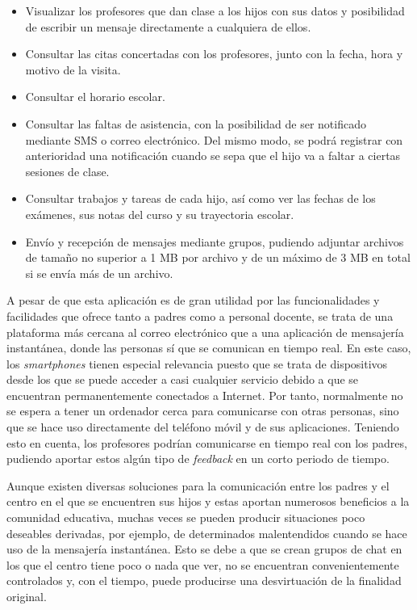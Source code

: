 \begin{itemize}
	\item Visualizar los profesores que dan clase a los hijos con sus datos y posibilidad de escribir un mensaje directamente a cualquiera de ellos.
	\item Consultar las citas concertadas con los profesores, junto con la fecha, hora y motivo de la visita.
	\item Consultar el horario escolar.
	\item Consultar las faltas de asistencia, con la posibilidad de ser notificado mediante \acf{SMS} o correo electrónico. Del mismo modo, se podrá registrar con anterioridad una notificación cuando se sepa que el hijo va a faltar a ciertas sesiones de clase.
	\item Consultar trabajos y tareas de cada hijo, así como ver las fechas de los exámenes, sus notas del curso y su trayectoria escolar.
	\item Envío y recepción de mensajes mediante grupos, pudiendo adjuntar archivos de tamaño no superior a 1 \acf{MB} por archivo y de un máximo de 3 \acs{MB} en total si se envía más de un archivo.
\end{itemize}

A pesar de que esta aplicación es de gran utilidad por las funcionalidades y facilidades que ofrece tanto a padres como a personal docente, se trata de una plataforma más cercana al correo electrónico que a una aplicación de mensajería instantánea, donde las personas sí que se comunican en tiempo real. En este caso, los \textit{smartphones} tienen especial relevancia puesto que se trata de dispositivos desde los que se puede acceder a casi cualquier servicio debido a que se encuentran permanentemente conectados a Internet. Por tanto, normalmente no se espera a tener un ordenador cerca para comunicarse con otras personas, sino que se hace uso directamente del teléfono móvil y de sus aplicaciones. Teniendo esto en cuenta, los profesores podrían comunicarse en tiempo real con los padres, pudiendo aportar estos algún tipo de \textit{feedback} en un corto periodo de tiempo.

Aunque existen diversas soluciones para la comunicación entre los padres y el centro en el que se encuentren sus hijos y estas aportan numerosos beneficios a la comunidad educativa, muchas veces se pueden producir situaciones poco deseables derivadas, por ejemplo, de determinados malentendidos cuando se hace uso de la mensajería instantánea. Esto se debe a que se crean grupos de chat en los que el centro tiene poco o nada que ver, no se encuentran convenientemente controlados y, con el tiempo, puede producirse una desvirtuación de la finalidad original.

